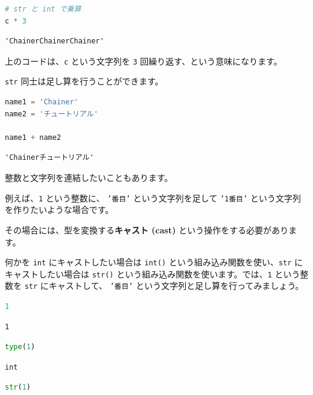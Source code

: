 \begin{lstlisting}[style=codecell,language=Python]
# str と int で乗算
c * 3
\end{lstlisting}

\begin{lstlisting}[style=outputcell]
'ChainerChainerChainer'
\end{lstlisting}

上のコードは、\texttt{c} という文字列を \texttt{3} 回繰り返す、という意味になります。


\texttt{str} 同士は足し算を行うことができます。


\begin{lstlisting}[style=codecell,language=Python]
name1 = 'Chainer'
name2 = 'チュートリアル'

name1 + name2
\end{lstlisting}

\begin{lstlisting}[style=outputcell]
'Chainerチュートリアル'
\end{lstlisting}

整数と文字列を連結したいこともあります。

例えば、\texttt{1} という整数に、 \texttt{'番目'} という文字列を足して \texttt{'1番目'} という文字列を作りたいような場合です。

その場合には、型を変換する\textbf{キャスト (cast)} という操作をする必要があります。


何かを \texttt{int} にキャストしたい場合は \texttt{int()} という組み込み関数を使い、\texttt{str} にキャストしたい場合は \texttt{str()} という組み込み関数を使います。では、\texttt{1} という整数を \texttt{str} にキャストして、 \texttt{'番目'} という文字列と足し算を行ってみましょう。


\begin{lstlisting}[style=codecell,language=Python]
1
\end{lstlisting}

\begin{lstlisting}[style=outputcell]
1
\end{lstlisting}

\begin{lstlisting}[style=codecell,language=Python]
type(1)
\end{lstlisting}

\begin{lstlisting}[style=outputcell]
int
\end{lstlisting}

\begin{lstlisting}[style=codecell,language=Python]
str(1)
\end{lstlisting}


